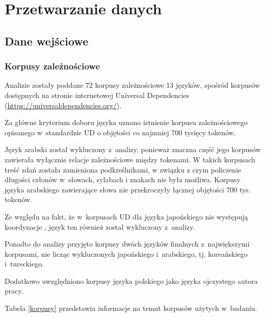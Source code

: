 \chapter{Przetwarzanie danych} \label{ch4}
\section{Dane wejściowe}
\subsection{Korpusy zależnościowe}

Analizie zostały poddane 72 korpusy zależnościowe 13 języków, spośród korpusów dostępnych na stronie internetowej Universal Dependencies (\url{https://universaldependencies.org/}).

Za główne kryterium doboru języka uznano istnienie korpusu zależnościowego opisanego w~standardzie UD o objętości co najmniej 700 tysięcy tokenów.  

Język arabski został wykluczony z~analizy, ponieważ znaczna część jego korpusów zawierała wyłącznie relacje zależnościowe między tokenami. W takich korpusach treść zdań została zamieniona podkreślnikami, w związku z czym policzenie długości członów w~słowach, sylabach i znakach nie była możliwa.  Korpusy języka arabskiego zawierające słowa nie przekroczyły łącznej objętości 700 tys. tokenów.

Ze względu na fakt, że w~korpusach UD dla języka japońskiego nie występują koordynacje \citep[s. 79]{kanayama2018coordinate}, język ten również został wykluczony z~analizy.

Ponadto do analizy przyjęto korpusy dwóch języków finalnych z~największymi korpusami, nie licząc wykluczonych japońskiego i~arabskiego, tj. koreańskiego i~tureckiego.

Dodatkowo uwzględniono korpusy języka polskiego jako języka ojczystego autora pracy. 

Tabela \ref{korpusy} przedstawia informacje na temat korpusów użytych w~badaniu.

\newpage


